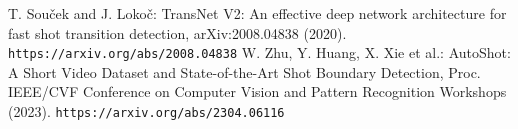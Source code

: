  T. Sou\v{c}ek and J. Loko\v{c}: TransNet V2: An effective deep network architecture for fast shot transition detection, arXiv:2008.04838 (2020). {\tt https://arxiv.org/abs/2008.04838}
 W. Zhu, Y. Huang, X. Xie et al.: AutoShot: A Short Video Dataset and State-of-the-Art Shot Boundary Detection, Proc. IEEE/CVF Conference on Computer Vision and Pattern Recognition Workshops (2023). {\tt https://arxiv.org/abs/2304.06116}
